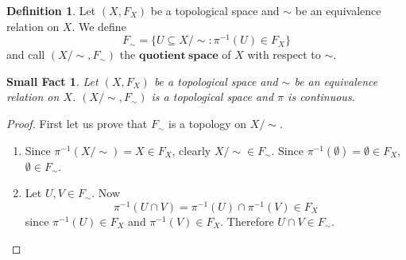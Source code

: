 \documentclass[10pt,reqno]{amsart}
\newtheorem*{Small Fact}{Small Fact}
\newtheorem*{Small Fact about Basis}{Small Fact about Basis}
\newtheorem*{Tiny Fact about Projection Maps}{Tiny Fact about Projection Maps}
\theoremstyle{definition}
\newtheorem*{Definition}{Definition}
\newtheorem{PART II: Creating News Spaces from Old Spaces}{PART II: Creating News Spaces from Old Spaces}
\begin{document}
\begin{Definition}
Let $(X, F_X)$ be a topological space and $\sim$ be an equivalence relation on $X$. We define $$F_{\sim} = \{U \subseteq X / \sim : \pi^{-1}(U) \in F_X\}$$ and call $(X / \sim, F_{\sim})$ the $\mathbf{quotient \ space}$ of $X$ with respect to $\sim$. 
\end{Definition}

\begin{Small Fact}
Let $(X, F_X)$ be a topological space and $\sim$ be an equivalence relation on $X$. $(X / \sim, F_{\sim})$ is a topological space and $\pi$ is continuous. 
\end{Small Fact}
\begin{proof}
First let us prove that $F_{\sim}$ is a topology on $X / \sim$. 
\begin{enumerate}
	\item Since $\pi^{-1}(X / \sim) = X \in F_X$, clearly $X / \sim \in F_{\sim}$. Since $\pi^{-1}(\emptyset) = \emptyset \in F_X$, $\emptyset \in F_{\sim}$. 
	\item Let $U, V \in F_{\sim}$. Now $$\pi^{-1}(U \cap V) = \pi^{-1}(U) \cap \pi^{-1}(V) \in F_X$$ since $ \pi^{-1}(U) \in F_X$ and $\pi^{-1}(V) \in F_X$. Therefore $U \cap V \in F_{\sim}$. 
\end{enumerate}
\end{proof}
\end{document}
